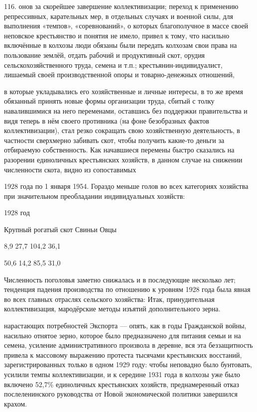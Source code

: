\label{116-1}
116. онов за скорейшее завершение коллективизации; переход к применению репрессивных, карательных мер, в отдельных случаях и военной силы, для выполнения «темпов», «соревнований», о которых благополучное в массе своей неповское крестьянство и понятия не имело, привел к тому, что насильно включённые в колхозы люди обязаны были передать колхозам свои права на пользование землёй, отдать рабочий и продуктивный скот, орудия сельскохозяйственного труда, семена и т.п.; крестьянин-индивидуалист, лишаемый своей производственной опоры и товарно-денежных отношений,

\label{117-1}
в которые укладывались его хозяйственные и личные интересы, в то же время обязанный принять новые формы организации труда, сбитый с толку навалившимися на него переменами, оставшись без поддержки правительства и видя теперь в нём своего противника (на фоне безобразных фактов коллективизации), стал резко сокращать свою хозяйственную деятельность, в частности сверхмерно забивать скот, чтобы получить какие-то деньги за отбираемую собственность. Как начавшиеся перемены быстро сказались на разорении единоличных крестьянских хозяйств, в данном случае на снижении численности скота, видно из сопоставимых

\label{118-1}
1928 года по 1 января 1954. Гораздо меньше голов во всех категориях хозяйства при значительном преобладании индивидуальных хозяйств:

1928 год

Крупный рогатый скот Свиньи Овцы

8,9 27,7 104,2 36,1

50,6 14,2 85,5 31,0

Численность поголовья заметно снижалась и в последующие несколько лет; тенденция падения производства по отношению к уровням 1928 года была явная во всех главных отраслях сельского хозяйства: Итак, принудительная коллективизация, мародёрские методы изъятий дополнительного зерна.

\label{119-1}
нарастающих потребностей Экспорта — опять, как в годы Гражданской войны, насильно отнятое зерно, которое было предназначено для питания семьи и на семена, усиление административного произвола в деревне, вся эта беззащитность привела к массовому выражению протеста тысячами крестьянских восстаний, зарегистрированных только в одном 1929 году: чтобы неповадно было бунтовать, усилили темпы коллективизации, и к середине 1931 года в колхозы уже было включено 52,7\% единоличных крестьянских хозяйств, преднамеренный отказ послеленинского руководства от Новой экономической политики завершился крахом.


